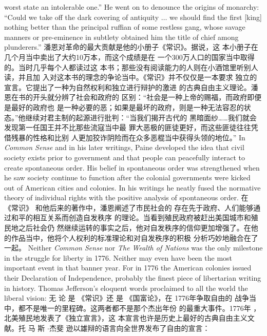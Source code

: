\begin{paracol}{2}
worst state an intolerable one.'' He went on to denounce the
origins of monarchy: ``Could we take off the dark covering of
antiquity $\ldots$ we should find the first [king] nothing better than the principal ruffian of some restless gang, whose savage
manners or pre-eminence in subtlety obtained him the title of
chief among plunderers.''
\switchcolumn
潘恩对革命的最大贡献是他的小册子《常识》。据说，这
本小册子在几个月当中卖出了大约10万本，而这个成绩是在
一个300万人口的国家当中取得的。当时几乎每个人都读过这
本书；那些没有阅读能力的人则在小酒馆里听别人读，并且加
入对这本书的理念的争论当中。《常识》并不仅仅是一本要求
独立的宣言。它提出了一种为自然权利和独立进行辩护的激进
的古典自由主义理论。潘恩在书的开头就分辨了社会和政府的
区别：“社会是一种上帝的赐福，而政府即便是最好的政府也
是一种必要的恶；如果是最坏的政府，则是一种无法容忍的状
态。”他继续对君主制的起源进行批判：“当我们揭开古代的
黑暗面纱……我们就会发现第一任国王并不比那些流寇当中最
罪大恶极的匪徒更好，而这些匪徒往往凭借残暴的性格和比别
人更加狡诈阴险而在众多恶棍当中获得头领的地位。”
\switchcolumn*
In \textit{Common Sense} and in his later writings, Paine developed the
idea that civil society exists prior to government and that people can peacefully interact to create spontaneous order. His belief in spontaneous order was strengthened when he saw society
continue to function after the colonial governments were
kicked out of American cities and colonies. In his writings he
neatly fused the normative theory of individual rights with the
positive analysis of spontaneous order.
\switchcolumn
在 《常识》 和他后来的著作中，潘恩阐述了市民社会的
存在先于政府、人们能够通过和平的相互关系而创造自发秩序
的理论。当看到殖民政府被赶出美国城市和殖民地之后社会仍
然继续运转的事实之后，他对自发秩序的信仰更加增强了。在他的作品当中，他将个人权利的标准理论和对自发秩序的积极
分析巧妙地融合在了一起。
\switchcolumn*
Neither \textit{Common Sense} nor \textit{The Wealth of Nations} was the only
milestone in the struggle for liberty in 1776. Neither may even
have been the most important event in that banner year. For in
1776 the American colonies issued their Declaration of Independence, probably the finest piece of libertarian writing in history. Thomas Jefferson's eloquent words proclaimed to all the
world the liberal vision:
\switchcolumn
无 论 是 《常识》还 是 《国富论》，在 1776年争取自由的
战争当中，都不是唯一的里程碑。这两者都不是那个杰出年份
的最重大事件。1776年 ，北美殖民地发表了《独立宣言》，这
本宣言也许是历史上最好的古典自由主义文献。托 马 斯 $\cdot$杰斐
逊以雄辩的语言向全世界发布了自由的宣言：
\switchcolumn*
\begin{quote}

\end{quote}
\end{paracol}
